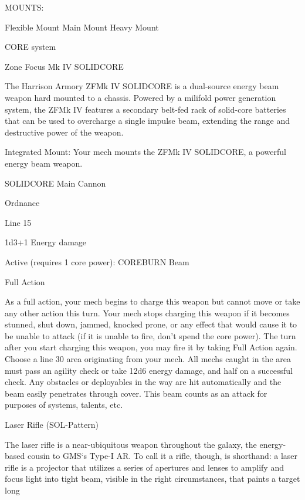                                                  MOUNTS:

 Flexible Mount                    Main Mount                            Heavy Mount

                                               CORE system




                                       Zone Focus Mk IV  SOLIDCORE

 The Harrison Armory ZFMk IV SOLIDCORE is a dual-source energy beam weapon hard mounted to a
 chassis. Powered by a milifold power generation system, the ZFMk IV features a secondary belt-fed
 rack of solid-core batteries that can be used to overcharge a single impulse beam, extending the range
 and destructive power of the weapon.

  Integrated Mount: Your mech mounts the ZFMk IV SOLIDCORE, a powerful energy beam weapon.

 SOLIDCORE
  Main Cannon

 Ordnance

  Line 15

  1d3+1 Energy damage


 Active (requires 1 core power): COREBURN Beam

  Full Action

 As a full action, your mech begins to charge this weapon but cannot move or take any other action this
 turn. Your mech stops charging this weapon if it becomes stunned, shut down, jammed, knocked
  prone, or any effect that would cause it to be unable to attack (if it is unable to fire, don’t spend the
 core power). The turn after you start charging this weapon, you may fire it by taking Full Action again.
 Choose a line 30 area originating from your mech. All mechs caught in the area must pass an agility
 check or take 12d6 energy damage, and half on a successful check. Any obstacles or deployables in
 the way are hit automatically and the beam easily penetrates through cover. This beam counts as an
 attack for purposes of systems, talents, etc.

Laser Rifle (SOL-Pattern)

The laser rifle is a near-ubiquitous weapon throughout the galaxy, the energy-based cousin to GMS‘s Type-I
AR. To call it a rifle, though, is shorthand: a laser rifle is a projector that utilizes a series of apertures and
lenses to amplify and focus light into tight beam, visible in the right circumstances, that paints a target long

